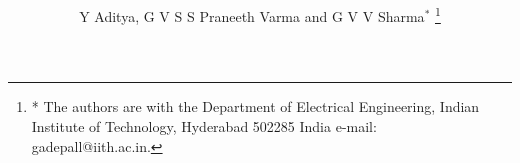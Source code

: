 \documentclass[journal,12pt,twocolumn]{IEEEtran}
\begin{document}

\def\putbox#1#2#3{\makebox[0in][l]{\makebox[#1][l]{}\raisebox{\baselineskip}[0in][0in]{\raisebox{#2}[0in][0in]{#3}}}}
     \def\rightbox#1{\makebox[0in][r]{#1}}
     \def\centbox#1{\makebox[0in]{#1}}
     \def\topbox#1{\raisebox{-\baselineskip}[0in][0in]{#1}}
     \def\midbox#1{\raisebox{-0.5\baselineskip}[0in][0in]{#1}}

\vspace{3cm}


\title{%
}


%
%
%

\author{Y Aditya, G V S S Praneeth Varma and G V V Sharma$^{*}$%
\thanks{* The authors are with the Department
of Electrical Engineering, Indian Institute of Technology, Hyderabad
502285 India e-mail:  gadepall@iith.ac.in.}%
}
% 
%
\end{document}
